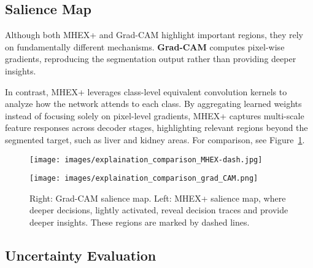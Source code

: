 \documentclass[runningheads]{llncs}
\begin{document}
\subsection{Salience Map}
Although both MHEX+ and Grad-CAM highlight important regions, they rely on fundamentally different mechanisms. \textbf{Grad-CAM} computes pixel-wise gradients, reproducing the segmentation output rather than providing deeper insights.

In contrast, MHEX+ leverages class-level equivalent convolution kernels to analyze how the network attends to each class. By aggregating learned weights instead of focusing solely on pixel-level gradients, MHEX+ captures multi-scale feature responses across decoder stages, highlighting relevant regions beyond the segmented target, such as liver and kidney areas. For comparison, see Figure~\ref{fig:explaination_comparison}. 

\begin{figure}[htbp]
\centering
    \begin{minipage}[t]{0.45\textwidth} 
        \vspace{0pt}
        \texttt{[image: images/explaination\_comparison\_MHEX-dash.jpg]}
        \label{fig:image1}
    \end{minipage}
\hspace{2mm}
    \begin{minipage}[t]{0.4\textwidth} 
    \centering

        \begin{minipage}[t]{0.55\linewidth}
            \vspace{1pt} \raggedright
            \texttt{[image: images/explaination\_comparison\_grad\_CAM.png]}
            \label{fig:image2}
        \end{minipage}
        \begin{minipage}[t]{\linewidth}
            \vspace{-6pt} \raggedright
            \caption{Right: Grad-CAM salience map. Left: MHEX+ salience map, where deeper decisions, lightly activated, reveal decision traces and provide deeper insights. These regions are marked by dashed lines.}
            \label{fig:explaination_comparison}
        \end{minipage}
    \end{minipage}
\end{figure}

\subsection{Uncertainty Evaluation}
\label{sec:uncertainty_exp}
\end{document}

